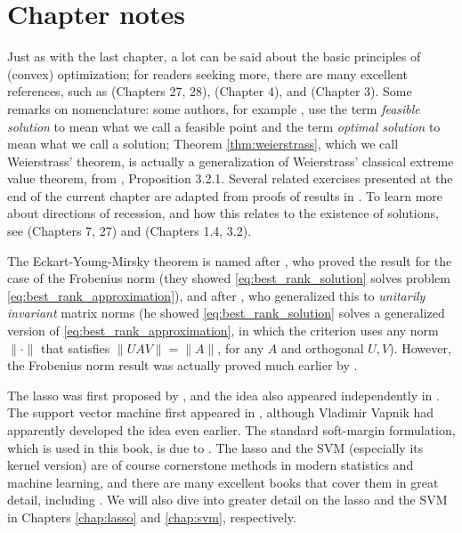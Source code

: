 \SkipTocEntry\section*{Chapter notes}

Just as with the last chapter, a lot can be said about the basic principles of
(convex) optimization; for readers seeking more, there are many excellent
references, such as \cite{rockafellar1970convex} (Chapters 27, 28),
\cite{boyd2004convex} (Chapter 4), and \cite{bertsekas2009convex} (Chapter 3).
Some remarks on nomenclature: some authors, for example
\cite{rockafellar1970convex, bertsekas2009convex}, use the term \emph{feasible
  solution} to mean what we call a feasible point and the term \emph{optimal
  solution} to mean what we call a solution; Theorem \ref{thm:weierstrass},
which we call Weierstrass' theorem, is actually a generalization of Weierstrass' 
classical extreme value theorem, from \cite{bertsekas2009convex}, Proposition
3.2.1. Several related exercises presented at the end of the current chapter are
adapted from proofs of results in \cite{bertsekas2009convex}. To learn more
about directions of recession, and how this relates to the existence of
solutions, see \cite{rockafellar1970convex} (Chapters 7, 27) and
\cite{bertsekas2009convex} (Chapters 1.4, 3.2).

The Eckart-Young-Mirsky theorem is named after \cite{eckart1936approximation},
who proved the result for the case of the Frobenius norm (they showed
\eqref{eq:best_rank_solution} solves problem
\eqref{eq:best_rank_approximation}), and after \cite{mirsky1960symmetric}, who
generalized this to \emph{unitarily invariant} matrix norms (he showed
\eqref{eq:best_rank_solution} solves a generalized version of
\eqref{eq:best_rank_approximation}, in which the criterion uses any norm  
$\|\cdot\|$ that satisfies $\|U A V\| = \|A\|$, for any $A$ and orthogonal
$U,V$). However, the Frobenius norm result was actually proved much earlier by  
\cite{schmidt1907theorie}. 

The lasso was first proposed by \cite{tibshirani1996regression}, and the idea
also appeared independently in \cite{chen1998atomic}. The support vector machine
first appeared in \cite{boser1992training}, although Vladimir Vapnik had
apparently developed the idea even earlier. The standard soft-margin
formulation, which is used in this book, is due to \cite{cortes1995support}. The
lasso and the SVM (especially its kernel version) are of course cornerstone
methods in modern statistics and machine learning, and there are many excellent
books that cover them in great detail, including \cite{hastie2009elements,
  scholkopf2002learning, hastie2015statistical}. We will also dive into greater
detail on the lasso and the SVM in Chapters \ref{chap:lasso} and \ref{chap:svm},
respectively.   

